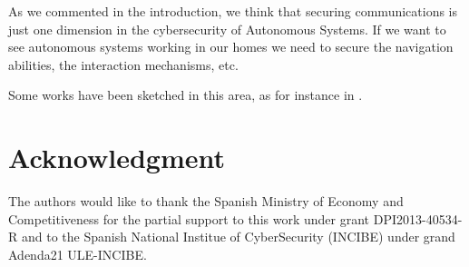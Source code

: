 \documentclass[journal,twoside]{JoPhA}
\begin{document}
As we commented in the introduction, we think that securing communications is just one dimension in  the cybersecurity of Autonomous Systems. If we want to see autonomous systems working in our homes we need to secure the navigation abilities, the interaction mechanisms, etc. 
 
Some works have been sketched in this area, as for instance in \cite{Guiochet2016}.




\section*{Acknowledgment}
The authors would  like to thank the Spanish Ministry of Economy and Competitiveness for the partial support to this work under grant DPI2013-40534-R and to the Spanish National Institue of CyberSecurity (INCIBE) under grand Adenda21 ULE-INCIBE.

 

\end{document}
